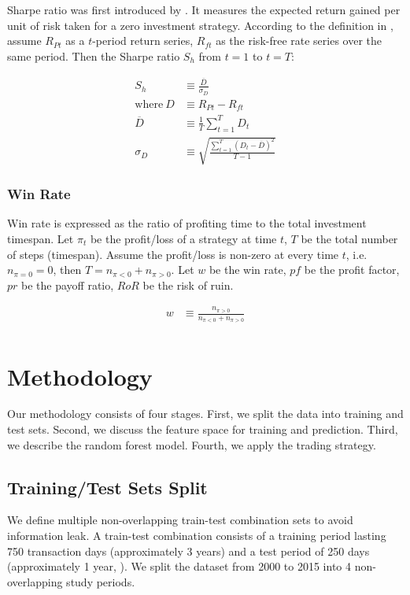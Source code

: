 \documentclass[12pt]{article}
\begin{document}
Sharpe ratio was first introduced by \cite{sharpe1966}. It measures the expected return gained per unit of risk taken for a zero investment strategy. According to the definition in \cite{sharpe1994}, assume \(R_{Pt}\) as a \(t\)-period return series, \(R_{ft}\) as the risk-free rate series over the same period. Then the Sharpe ratio \(S_h\) from \(t=1\) to \(t=T\):

\begin{align*}
  S_h &\equiv \frac{\overline{D}}{\sigma_D} \\
  \text{where}~D &\equiv R_{Pt} - R_{ft} \\
  \overline{D} &\equiv \frac{1}{T} \sum_{t=1}^T D_t \\
  \sigma_D &\equiv \sqrt{\frac{\sum_{t=1}^T (D_t-\overline{D})^2}{T-1}}
\end{align*}

\subsubsection{Win Rate}

Win rate is expressed as the ratio of profiting time to the total investment timespan. Let \(\pi_t\) be the profit/loss of a strategy at time \(t\), \(T\) be the total number of steps (timespan). Assume the profit/loss is non-zero at every time \(t\), i.e. \(n_{\pi=0} = 0\), then \(T = n_{\pi<0} + n_{\pi>0}\). Let \(w\) be the win rate, \(pf\) be the profit factor, \(pr\) be the payoff ratio, \(RoR\) be the risk of ruin.

\begin{align*}
  w &\equiv \frac{n_{\pi>0}}{n_{\pi<0} + n_{\pi>0}} \\
\end{align*}


\section{Methodology}

Our methodology consists of four stages. First, we split the data into training and test sets. Second, we discuss the feature space for training and prediction. Third, we describe the random forest model. Fourth, we apply the trading strategy.

\subsection{Training/Test Sets Split}

We define multiple non-overlapping train-test combination sets to avoid information leak. A train-test combination consists of a training period lasting 750 transaction days (approximately 3 years) and a test period of 250 days (approximately 1 year, \cite{Fischer2017Deep}). We split the dataset from 2000 to 2015 into 4 non-overlapping study periods.
\end{document}
